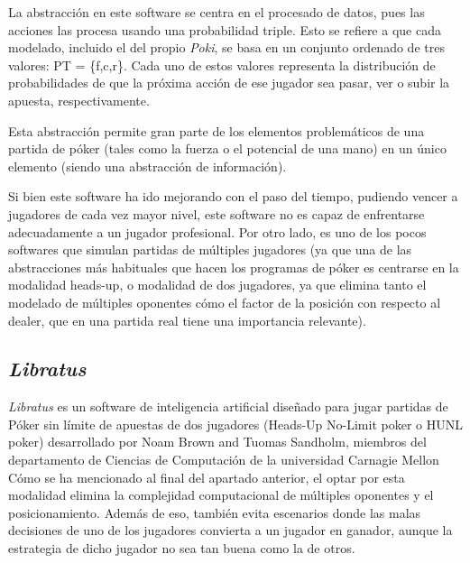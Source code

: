 La abstracción en este software se centra en el procesado de datos, pues las acciones las procesa usando una probabilidad triple. Esto se refiere a que cada modelado, incluido el del propio \textit{Poki}, se basa en un conjunto ordenado de tres valores: PT = \{f,c,r\}. Cada uno de estos valores representa la distribución de probabilidades de que la próxima acción de ese jugador sea pasar, ver o subir la apuesta, respectivamente.\cite{Billings}

Esta abstracción permite gran parte de los elementos problemáticos de una partida de póker (tales como la fuerza o el potencial de una mano) en un único elemento (siendo una abstracción de información). 

Si bien este software ha ido mejorando con el paso del tiempo, pudiendo vencer a jugadores de cada vez mayor nivel, este software no es capaz de enfrentarse adecuadamente a un jugador profesional. Por otro lado, es uno de los pocos softwares que simulan partidas de múltiples jugadores (ya que una de las abstracciones más habituales que hacen los programas de póker es centrarse en la modalidad heads-up, o modalidad de dos jugadores, ya que elimina tanto el modelado de múltiples oponentes cómo el factor de la posición con respecto al dealer, que en una partida real tiene una importancia relevante).

\subsection{\textit{Libratus}}

\textit{Libratus} \cite{libratusScience2, libratusScience} es un software de inteligencia artificial diseñado para jugar partidas de Póker sin límite de apuestas de dos jugadores (Heads-Up No-Limit poker o HUNL poker) desarrollado por Noam Brown and Tuomas Sandholm, miembros del departamento de Ciencias de Computación de la universidad Carnagie Mellon
Cómo se ha mencionado al final del apartado anterior, el optar por esta modalidad elimina la complejidad computacional de múltiples oponentes y el posicionamiento. Además de eso, también evita escenarios donde las malas decisiones de uno de los jugadores convierta a un jugador en ganador, aunque la estrategia de dicho jugador no sea tan buena como la de otros.

